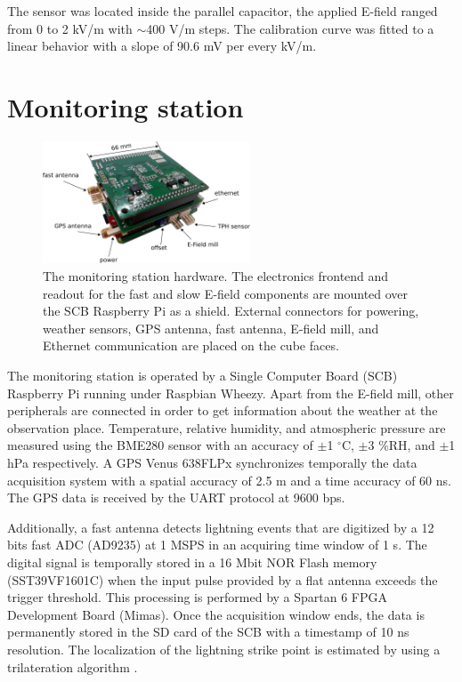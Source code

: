 \documentclass[a4paper]{jpconf}
\begin{document}
The sensor was located inside the parallel capacitor, the applied E-field ranged from 0 to 2 kV/m with $\sim$400 V/m steps. The calibration curve was fitted to a linear behavior with a slope of 90.6 mV per every kV/m. 

\section{Monitoring station}

\begin{figure}[h]
\begin{center}
\includegraphics[width=0.55\textwidth]{Figures/Station.eps}
\caption{\label{station} The monitoring station hardware. The electronics frontend and readout for the fast and slow E-field components are mounted over the SCB Raspberry Pi as a shield. External connectors for powering, weather sensors, GPS antenna, fast antenna, E-field mill, and Ethernet communication are placed on the cube faces.}
\end{center}
\end{figure}

The monitoring station is operated by a Single Computer Board (SCB) Raspberry Pi running under Raspbian Wheezy. Apart from the E-field mill, other peripherals are connected in order to get information about the weather at the observation place. Temperature, relative humidity, and atmospheric pressure are measured using the BME280 sensor with an accuracy of $\pm$1 $^{\circ}$C, $\pm$3 $\%$RH, and $\pm$1 hPa respectively. A GPS Venus 638FLPx synchronizes temporally the data acquisition system with a spatial accuracy of 2.5 m and a time accuracy of 60 ns. The GPS data is received by the UART protocol at 9600 bps.

Additionally, a fast antenna detects lightning events that are digitized by a 12 bits fast ADC (AD9235) at 1 MSPS in an acquiring time window of 1 s. The digital signal is temporally stored in a 16 Mbit NOR Flash memory (SST39VF1601C) when the input pulse provided by a flat antenna exceeds the trigger threshold. This processing is performed by a Spartan 6 FPGA Development Board (Mimas). Once the acquisition window ends, the data is permanently stored in the SD card of the SCB with a timestamp of 10 ns resolution. The localization of the lightning strike point is estimated by using a trilateration algorithm \cite{MialdeaFlor2019}.
\end{document}
